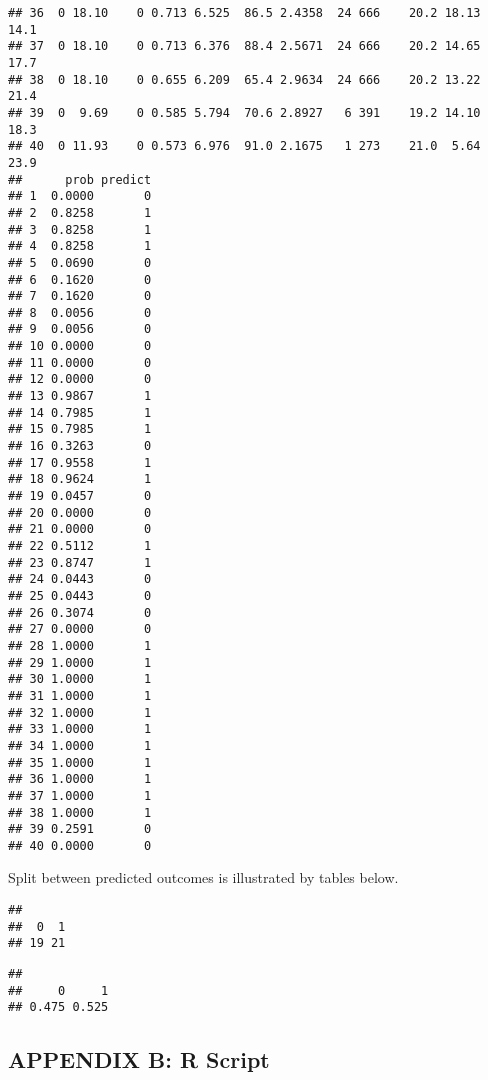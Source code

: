 \documentclass[]{article}
\begin{document}
\begin{verbatim}
## 36  0 18.10    0 0.713 6.525  86.5 2.4358  24 666    20.2 18.13 14.1
## 37  0 18.10    0 0.713 6.376  88.4 2.5671  24 666    20.2 14.65 17.7
## 38  0 18.10    0 0.655 6.209  65.4 2.9634  24 666    20.2 13.22 21.4
## 39  0  9.69    0 0.585 5.794  70.6 2.8927   6 391    19.2 14.10 18.3
## 40  0 11.93    0 0.573 6.976  91.0 2.1675   1 273    21.0  5.64 23.9
##      prob predict
## 1  0.0000       0
## 2  0.8258       1
## 3  0.8258       1
## 4  0.8258       1
## 5  0.0690       0
## 6  0.1620       0
## 7  0.1620       0
## 8  0.0056       0
## 9  0.0056       0
## 10 0.0000       0
## 11 0.0000       0
## 12 0.0000       0
## 13 0.9867       1
## 14 0.7985       1
## 15 0.7985       1
## 16 0.3263       0
## 17 0.9558       1
## 18 0.9624       1
## 19 0.0457       0
## 20 0.0000       0
## 21 0.0000       0
## 22 0.5112       1
## 23 0.8747       1
## 24 0.0443       0
## 25 0.0443       0
## 26 0.3074       0
## 27 0.0000       0
## 28 1.0000       1
## 29 1.0000       1
## 30 1.0000       1
## 31 1.0000       1
## 32 1.0000       1
## 33 1.0000       1
## 34 1.0000       1
## 35 1.0000       1
## 36 1.0000       1
## 37 1.0000       1
## 38 1.0000       1
## 39 0.2591       0
## 40 0.0000       0
\end{verbatim}

Split between predicted outcomes is illustrated by tables below.

\begin{verbatim}
## 
##  0  1 
## 19 21
\end{verbatim}

\begin{verbatim}
## 
##     0     1 
## 0.475 0.525
\end{verbatim}

\hypertarget{appendix-b-r-script}{%
\subsection{APPENDIX B: R Script}\label{appendix-b-r-script}}
\end{document}
